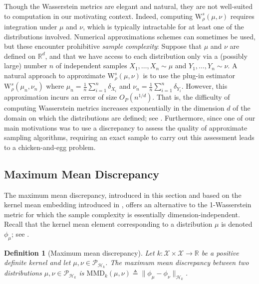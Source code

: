 \documentclass[12pt,paper=letter]{scrreprt}
\newtheorem{definition}{Definition}[chapter]
\def\defeq{\triangleq} %
\begin{document}
Though the Wasserstein metrics are elegant and natural, they are not well-suited to computation in our motivating context.
Indeed, computing $\mathrm{W}_\rho^s(\mu,\nu)$ requires integration under $\mu$ and $\nu$, which is typically intractable for at least one of the distributions involved.
Numerical approximations schemes can sometimes be used, but these encounter prohibitive \emph{sample complexity}:
Suppose that $\mu$ and $\nu$ are defined on $\mathbb{R}^d$, and that we have access to each distribution only via a (possibly large) number $n$ of independent samples $X_1,\dots,X_n \sim \mu$ and $Y_1,\dots ,Y_n \sim \nu$.
A natural approach to approximate $\mathrm{W}_\rho^s(\mu,\nu)$ is to use the plug-in estimator $\mathrm{W}_\rho^s(\mu_n,\nu_n)$ where $\mu_n = \frac{1}{n} \sum_{i=1}^n \delta_{X_i}$ and $\nu_n = \frac{1}{n} \sum_{i=1}^n \delta_{Y_i}$.
However, this approximation incurs an error of size $O_P(n^{1/d})$.
That is, the difficulty of computing Wasserstein metrics increases exponentially in the dimension $d$ of the domain on which the distributions are defined; see \citet{sriperumbudur2012empirical}.
Furthermore, since one of our main motivations was to use a discrepancy to assess the quality of approximate sampling algorithms, requiring an exact sample to carry out this assessment leads to a chicken-and-egg problem.


\subsection{Maximum Mean Discrepancy}
\label{subsec: mmd}

The maximum mean discrepancy, introduced in this section and based on the kernel mean embedding introduced in , offers an alternative to the 1-Wasserstein metric for which the sample complexity is essentially dimension-independent.
Recall that the kernel mean element corresponding to a distribution $\mu$ is denoted $\phi_\mu$; see .

\begin{definition}[Maximum mean discrepancy]
Let $k : \mathcal{X} \times \mathcal{X} \rightarrow \mathbb{R}$ be a positive definite kernel and let $\mu, \nu \in \mathcal{P}_{\mathcal{H}_k}$.
The \emph{maximum mean discrepancy} between two distributions $\mu, \nu \in \mathcal{P}_{\mathcal{H}_k}$ is $\mathrm{MMD}_k(\mu,\nu) \defeq \|\phi_\mu - \phi_\nu \|_{\mathcal{H}_k}$.
\end{definition}
\end{document}

